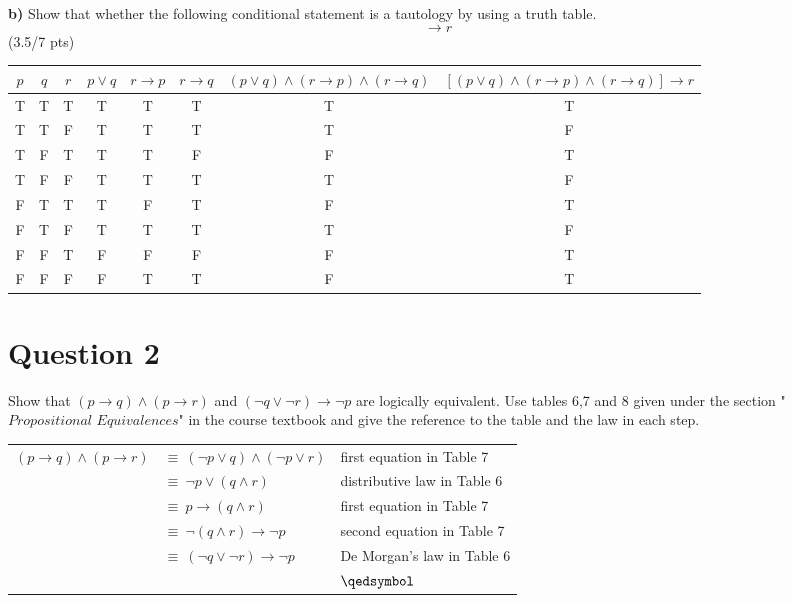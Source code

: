 \documentclass[a4paper,12pt]{article}
\newcommand\tab[1][1cm]{\hspace*{#1}}
\begin{document}
\newpage
\tab \textbf{b)} Show that whether the following conditional statement is a tautology by using a truth table.
\begin{equation*}
    [(p \vee q) \wedge (r \rightarrow p) \wedge (r \rightarrow q)] \rightarrow r
\end{equation*}
\hfill \small{(3.5/7 pts)}\\
\begin{tcolorbox}
\centering
\begin{tabular}{c|c|c|c|c|c|c|c}
    $p$ & $q$ & $r$ & $p \vee q$ & $r \rightarrow p$ & $r \rightarrow q$ & $(p \vee q) \wedge (r \rightarrow p) \wedge (r \rightarrow q)$ & $[(p \vee q) \wedge (r \rightarrow p) \wedge (r \rightarrow q)] \rightarrow r$ \\
    \hline
    T & T & T & T & T & T & T & T \\
    T & T & F & T & T & T & T & F \\
    T & F & T & T & T & F & F & T \\
    T & F & F & T & T & T & T & F \\
    F & T & T & T & F & T & F & T \\
    F & T & F & T & T & T & T & F \\
    F & F & T & F & F & F & F & T \\
    F & F & F & F & T & T & F & T 
\end{tabular}
\end{tcolorbox}

\section*{Question 2 \hfill {}}
\tab Show that $(p \rightarrow q) \wedge (p \rightarrow r)$ and $(\neg q \vee \neg r)\rightarrow \neg p$ are logically equivalent. Use tables 6,7 and 8 given under the section "$\textit{Propositional Equivalences}$" in the course textbook and give the reference to the table and the law in each step.

\begin{tcolorbox}
\centering
\begin{tabular}{r l l}
    $(p \rightarrow q) \wedge (p \rightarrow r)$ & $\equiv \ (\neg p \vee q) \wedge (\neg p \vee r)$ & first equation in Table 7 \\
    & $\equiv \ \neg p \vee (q \wedge r)$ & distributive law in Table 6 \\
    & $\equiv \ p \rightarrow (q \wedge r)$ & first equation in Table 7 \\
    & $\equiv \ \neg (q \wedge r) \rightarrow \neg p$ & second equation in Table 7 \\
    & $\equiv \ (\neg q \vee \neg r) \rightarrow \neg p$ & De Morgan's law in Table 6 \\
    & & \hfill $\qedsymbol$
\end{tabular}
\end{tcolorbox}
\end{document}
